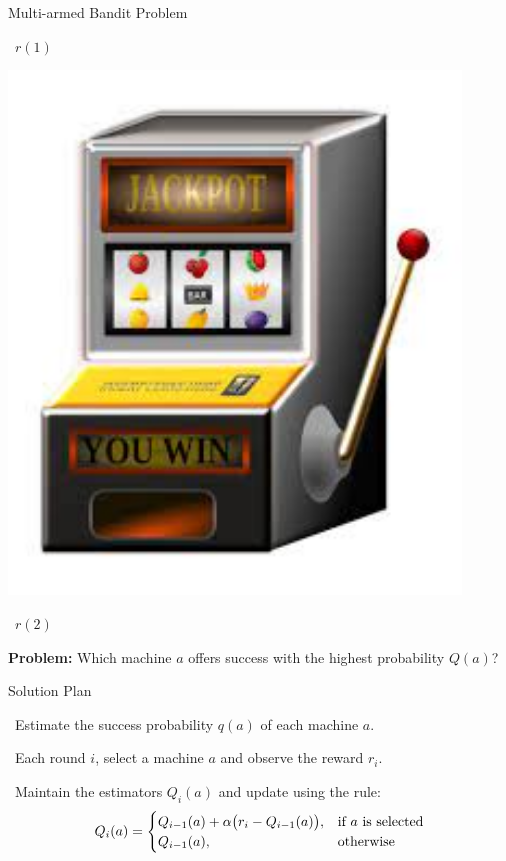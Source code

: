 \documentclass[11pt]{beamer}
\begin{document}
\begin{frame}{Multi-armed Bandit Problem}
\begin{center}
\begin{minipage}{.3\linewidth}
\begin{center}
\
$r(1)$
\end{center}
\end{minipage}\begin{minipage}{.3\linewidth}
\begin{center}
\includegraphics[width=0.9\textwidth]{images/slotmachine}

\
$r(2)$
\end{center}
\end{minipage}
\end{center}

\vspace{.5\baselineskip}

\textbf{Problem:} Which machine $a$ offers success with the highest probability $Q(a)$?

\end{frame}

\begin{frame}{Solution Plan}

\HandRight\ Estimate the success probability $q(a)$ of each machine $a$. \pause

\vspace{\baselineskip}

\HandRight\ Each round $i$, select a machine $a$ and observe the reward $r_i$. \pause

\vspace{\baselineskip}

\HandRight\ Maintain the estimators $Q_i(a)$ and update using the rule:
%
\[
Q_i(a) = \begin{cases}
Q_{i-1}(a) + \alpha\bigl(r_i - Q_{i-1}(a)\bigr), & \text{if $a$ is selected}\cr
Q_{i-1}(a), & \text{otherwise}
\end{cases}
\]

\end{frame}
\end{document}
